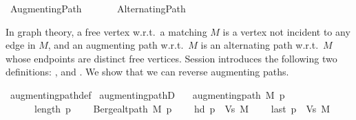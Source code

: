 %
\begin{isabellebody}%
%
%
\isadelimtheory
%
\endisadelimtheory
%
\isatagtheory
{}\isamarkupfalse%
\ Augmenting{\isacharunderscore}{\kern0pt}Path\isanewline
\ \ \isanewline
\ \ \ \ Alternating{\isacharunderscore}{\kern0pt}Path\isanewline
{}%
\endisatagtheory
{\isafoldtheory}%
%
\isadelimtheory
%
\endisadelimtheory
%
\begin{isamarkuptext}%
In graph theory, a free vertex w.r.t.\ a matching $M$ is a vertex not incident to any edge in $M$,
and an augmenting path w.r.t.\ $M$ is an alternating path w.r.t.\ $M$ whose endpoints are distinct
free vertices. Session  introduces the following two definitions:
, and . We show that we can reverse augmenting paths.%
\end{isamarkuptext}\isamarkuptrue%
%
\isadeliminvisible
%
\endisadeliminvisible
%
\isataginvisible
{}\isamarkupfalse%
\ augmenting{\isacharunderscore}{\kern0pt}path{\isacharunderscore}{\kern0pt}def\isanewline
{}\isamarkupfalse%
\ augmenting{\isacharunderscore}{\kern0pt}pathD{\isacharcolon}{\kern0pt}\isanewline
\ \ \ {\isachardoublequoteopen}augmenting{\isacharunderscore}{\kern0pt}path\ M\ p{\isachardoublequoteclose}\isanewline
\ \ \isanewline
\ \ \ \ {\isachardoublequoteopen}{}\ {\isasymle}\ length\ p{\isachardoublequoteclose}\isanewline
\ \ \ \ {\isachardoublequoteopen}Berge{\isachardot}{\kern0pt}alt{\isacharunderscore}{\kern0pt}path\ M\ p{\isachardoublequoteclose}\isanewline
\ \ \ \ {\isachardoublequoteopen}hd\ p\ {\isasymnotin}\ Vs\ M{\isachardoublequoteclose}\isanewline
\ \ \ \ {\isachardoublequoteopen}last\ p\ {\isasymnotin}\ Vs\ M{\isachardoublequoteclose}%
\endisataginvisible
{\isafoldinvisible}%
%
\isadeliminvisible
%
\endisadeliminvisible
\isanewline
%
\isadelimproof
\ \ %
\endisadelimproof
%
\isatagproof
{}\isamarkupfalse%

\end{isabellebody}
